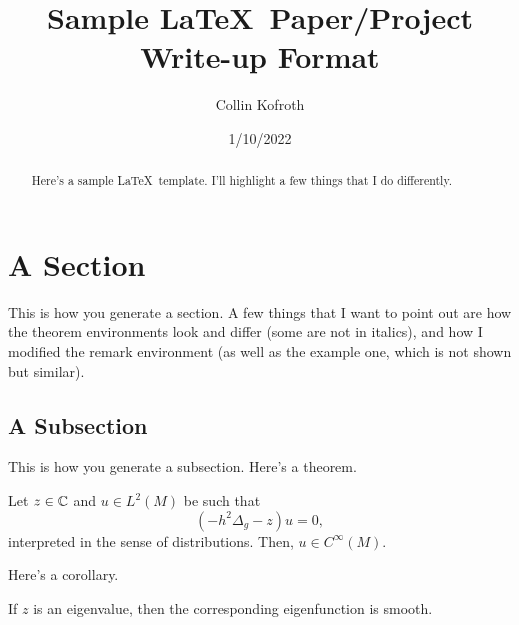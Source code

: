 \documentclass{amsart}
\title{Sample \LaTeX\ Paper/Project Write-up Format}
\author{{{Collin Kofroth}}}
\date{1/10/2022}
\numberwithin{equation}{section}
\numberwithin{figure}{section}
\begin{document}
\maketitle

\begin{abstract}

Here's a sample \LaTeX\ template. I'll highlight a few things that I do differently.

\end{abstract}

\tableofcontents


\section{A Section}

This is how you generate a section. A few things that I want to point out are how the theorem environments look and differ (some are not in italics), and how I modified the remark environment (as well as the example one, which is not shown but similar).

\subsection{A Subsection}

This is how you generate a subsection. Here's a theorem.

\begin{Th} \label{efun smooth}
Let $z\in\mathbb{C}$ and $u\in L^2(M)$ be such that $$(-h^2\Delta_g-z)u=0,$$ interpreted in the sense of distributions. Then, $u\in C^\infty(M)$.
\end{Th}

Here's a corollary.

\begin{Cor}
If $z$ is an eigenvalue, then the corresponding eigenfunction is smooth. 
\end{Cor}
\end{document}
